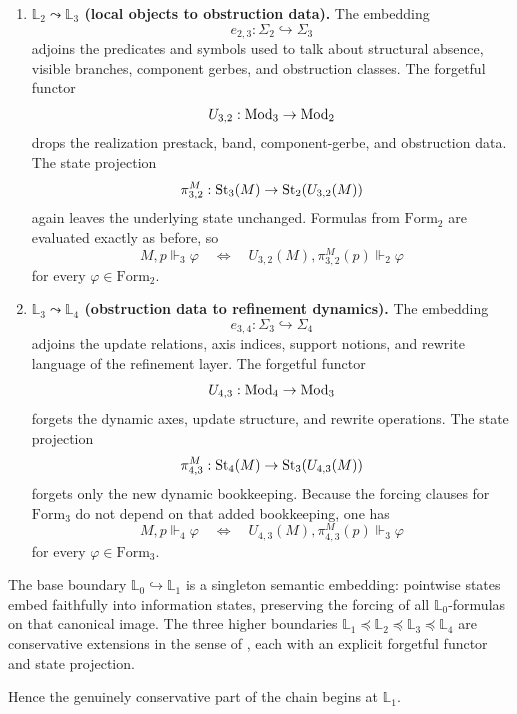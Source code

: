 \begin{proposition}
\begin{enumerate}[label=(\roman*),leftmargin=3em]
\item \textbf{$\mathbb L_2\leadsto\mathbb L_3$ (local objects to obstruction data).}
The embedding
\[
e_{2,3}:\Sigma_2\hookrightarrow \Sigma_3
\]
adjoins the predicates and symbols used to talk about structural absence, visible branches, component gerbes, and obstruction classes. The forgetful functor
\[
U_{3,2}:\mathrm{Mod}_3\to\mathrm{Mod}_2
\]
drops the realization prestack, band, component-gerbe, and obstruction data. The state projection
\[
\pi^M_{3,2}:\mathrm{St}_3(M)\to \mathrm{St}_2(U_{3,2}(M))
\]
again leaves the underlying state unchanged. Formulas from $\mathrm{Form}_2$ are evaluated exactly as before, so
\[
M,p\Vdash_3\varphi
\quad\Longleftrightarrow\quad
U_{3,2}(M),\pi^M_{3,2}(p)\Vdash_2\varphi
\]
for every $\varphi\in\mathrm{Form}_2$.

\item \textbf{$\mathbb L_3\leadsto\mathbb L_4$ (obstruction data to refinement dynamics).}
The embedding
\[
e_{3,4}:\Sigma_3\hookrightarrow \Sigma_4
\]
adjoins the update relations, axis indices, support notions, and rewrite language of the refinement layer. The forgetful functor
\[
U_{4,3}:\mathrm{Mod}_4\to\mathrm{Mod}_3
\]
forgets the dynamic axes, update structure, and rewrite operations. The state projection
\[
\pi^M_{4,3}:\mathrm{St}_4(M)\to \mathrm{St}_3(U_{4,3}(M))
\]
forgets only the new dynamic bookkeeping. Because the forcing clauses for $\mathrm{Form}_3$ do not depend on that added bookkeeping, one has
\[
M,p\Vdash_4\varphi
\quad\Longleftrightarrow\quad
U_{4,3}(M),\pi^M_{4,3}(p)\Vdash_3\varphi
\]
for every $\varphi\in\mathrm{Form}_3$.
\end{enumerate}
The base boundary $\mathbb L_0\hookrightarrow\mathbb L_1$ is a singleton semantic embedding: pointwise states embed faithfully into information states, preserving the forcing of all $\mathbb L_0$-formulas on that canonical image. The three higher boundaries $\mathbb L_1\preceq\mathbb L_2\preceq\mathbb L_3\preceq\mathbb L_4$ are conservative extensions in the sense of , each with an explicit forgetful functor and state projection.
\end{proposition}

Hence the genuinely conservative part of the chain begins at $\mathbb L_1$.
